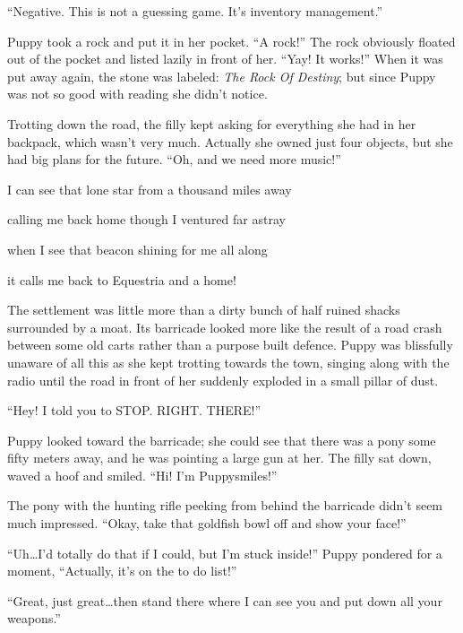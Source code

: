``{\mt Negative. This is not a guessing game. It's inventory management.}''

Puppy took a rock and put it in her pocket. ``A rock!'' The rock obviously floated out of the pocket and listed lazily in front of her. ``Yay! It works!'' When it was put away again, the stone was labeled: \emph{The Rock Of Destiny}; but since Puppy was not so good with reading she didn't notice.

Trotting down the road, the filly kept asking for everything she had in her backpack, which wasn't very much. Actually she owned just four objects, but she had big plans for the future. ``Oh, and we need more music!''



\begin{song}
    I can see that lone star from a thousand miles away
    
    calling me back home though I ventured far astray
    
    when I see that beacon shining for me all along
    
    it calls me back to Equestria and a home!
\end{song}

\horizonline


The settlement was little more than a dirty bunch of half ruined shacks surrounded by a moat. Its barricade looked more like the result of a road crash between some old carts rather than a purpose built defence. Puppy was blissfully unaware of all this as she kept trotting towards the town, singing along with the radio until the road in front of her suddenly exploded in a small pillar of dust.

``Hey! I told you to STOP. RIGHT. THERE!''

Puppy looked toward the barricade; she could see that there was a pony some fifty meters away, and he was pointing a large gun at her. The filly sat down, waved a hoof and smiled. ``Hi! I'm Puppysmiles!''

The pony with the hunting rifle peeking from behind the barricade didn't seem much impressed. ``Okay, take that goldfish bowl off and show your face!''

``Uh\dots I'd totally do that if I could, but I'm stuck inside!'' Puppy pondered for a moment, ``Actually, it's on the to do list!''

``Great, just great\dots then stand there where I can see you and put down all your weapons.''

